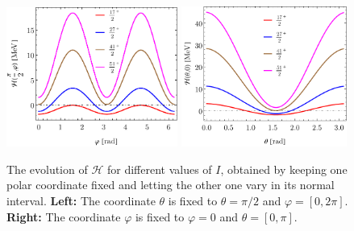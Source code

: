 \begin{figure}
    \centering
    \includegraphics[width=0.5\textwidth]{Chapters/Figures/parity-partners-plots/H-minimal-m1-phi.pdf}
    \includegraphics[width=0.485\textwidth]{Chapters/Figures/parity-partners-plots/H-minimal-m1-theta.pdf}
    \caption{The evolution of $\mathcal{H}$ for different values of $I$, obtained by keeping one polar coordinate fixed and letting the other one vary in its normal interval. \textbf{Left:} The coordinate $\theta$ is fixed to $\theta=\pi/2$ and $\varphi=[0,2\pi]$. \textbf{Right:} The coordinate $\varphi$ is fixed to $\varphi=0$ and $\theta=[0,\pi]$.}
    \label{CEF-theta-phi-dependence}
\end{figure}

